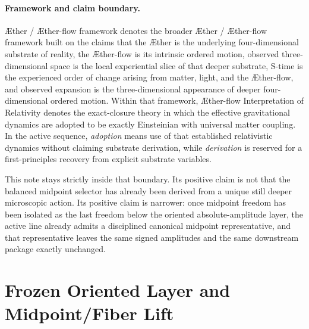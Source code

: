 \documentclass[11pt]{article}
\newcommand{\Aether}{\AE{}ther}
\newcommand{\Aflow}{\AE{}ther-flow}
\newcommand{\TheoryName}{\Aflow{} Interpretation of Relativity}
\newcommand{\TheoryProgram}{\Aether{} / \Aflow{} framework}
\begin{document}
\paragraph{Framework and claim boundary.}
\TheoryProgram{} denotes the broader \Aether{} / \Aflow{} framework built on the claims that the \Aether{} is the underlying four-dimensional substrate of reality, the \Aflow{} is its intrinsic ordered motion, observed three-dimensional space is the local experiential slice of that deeper substrate, S-time is the experienced order of change arising from matter, light, and the \Aflow{}, and observed expansion is the three-dimensional appearance of deeper four-dimensional ordered motion. Within that framework, \TheoryName{} denotes the exact-closure theory in which the effective gravitational dynamics are adopted to be exactly Einsteinian with universal matter coupling. In the active sequence, \emph{adoption} means use of that established relativistic dynamics without claiming substrate derivation, while \emph{derivation} is reserved for a first-principles recovery from explicit substrate variables.

This note stays strictly inside that boundary. Its positive claim is not that the balanced midpoint selector has already been derived from a unique still deeper microscopic action. Its positive claim is narrower: once midpoint freedom has been isolated as the last freedom below the oriented absolute-amplitude layer, the active line already admits a disciplined canonical midpoint representative, and that representative leaves the same signed amplitudes and the same downstream package exactly unchanged.

\section{Frozen Oriented Layer and Midpoint/Fiber Lift}
\end{document}
